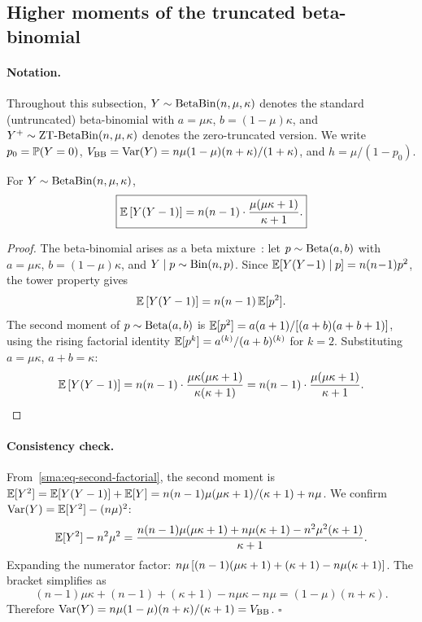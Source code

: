 
\subsection{Higher moments of the truncated beta-binomial}
\label{sma:higher-moments}

\paragraph{Notation.}
Throughout this subsection, $Y \sim \operatorname{BetaBin}(n,\mu,\kappa)$ denotes the
standard (untruncated) beta-binomial with $a = \mu\kappa$,
$b = (1-\mu)\kappa$, and
$Y^+ \sim \operatorname{ZT\text{-}BetaBin}(n,\mu,\kappa)$ denotes the zero-truncated version.  We
write $p_0 = \mathbb{P}(Y = 0)$,
$V_{\mathrm{BB}} = \operatorname*{Var}(Y) = n\mu(1-\mu)(n+\kappa)/(1+\kappa)$, and
$h = \mu/(1-p_0)$.


\begin{lemma}\label{sma:lem-second-factorial}
  For $Y \sim \operatorname{BetaBin}(n,\mu,\kappa)$,
  \begin{equation}\label{sma:eq-second-factorial}
    \boxed{\mathbb{E}\left[{Y(Y-1)}\right] = n(n-1) \cdot \frac{\mu(\mu\kappa + 1)}{\kappa + 1}.}
  \end{equation}
\end{lemma}

\begin{proof}
  The beta-binomial arises as a beta
  mixture~\citep{Griffiths1973}:
  let $p \sim \operatorname{Beta}(a,b)$ with $a = \mu\kappa$,
  $b = (1\!-\!\mu)\kappa$, and $Y \mid p \sim \operatorname{Bin}(n,p)$.
  Since $\mathbb{E}[Y(Y\!-\!1) \mid p] = n(n\!-\!1)p^2$,
  the tower property gives
  \[
    \mathbb{E}\left[{Y(Y-1)}\right] = n(n-1)\,\mathbb{E}[p^2].
  \]
  The second moment of $p \sim \operatorname{Beta}(a,b)$ is
  $\mathbb{E}[p^2] = a(a+1)/[(a+b)(a+b+1)]$, using the rising factorial identity
  $\mathbb{E}[p^k] = a^{(k)}/(a+b)^{(k)}$ for $k = 2$.  Substituting
  $a = \mu\kappa$, $a + b = \kappa$:
  \[
    \mathbb{E}\left[{Y(Y-1)}\right]
    = n(n-1) \cdot \frac{\mu\kappa(\mu\kappa + 1)}{\kappa(\kappa+1)}
    = n(n-1) \cdot \frac{\mu(\mu\kappa + 1)}{\kappa+1}. \qedhere
  \]
\end{proof}

\paragraph{Consistency check.}
From~\eqref{sma:eq-second-factorial}, the second moment is
$\mathbb{E}[Y^2] = \mathbb{E}[Y(Y-1)] + \mathbb{E}[Y] = n(n-1)\mu(\mu\kappa+1)/(\kappa+1) + n\mu$.
We confirm $\operatorname*{Var}(Y) = \mathbb{E}[Y^2] - (n\mu)^2$:
\[
  \mathbb{E}[Y^2] - n^2\mu^2
  = \frac{n(n-1)\mu(\mu\kappa+1) + n\mu(\kappa+1) - n^2\mu^2(\kappa+1)}
         {\kappa+1}.
\]
Expanding the numerator factor:
$n\mu\left[{(n-1)(\mu\kappa+1) + (\kappa+1) - n\mu(\kappa+1)}\right]$.  The bracket
simplifies as
\[
  (n-1)\mu\kappa + (n-1) + (\kappa+1) - n\mu\kappa - n\mu
  = (1-\mu)(n + \kappa).
\]
Therefore
$\operatorname*{Var}(Y) = n\mu(1-\mu)(n+\kappa)/(\kappa+1) = V_{\mathrm{BB}}$.
\enspace$\square$

